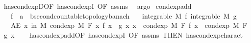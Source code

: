 \begin{isabellebody}
%
\isatagproof
{}\isamarkupfalse%
\ has{\isacharunderscore}{\kern0pt}cond{\isacharunderscore}{\kern0pt}expD{\isacharparenleft}{\kern0pt}{}{\isacharparenright}{\kern0pt}{\isacharbrackleft}{\kern0pt}OF\ has{\isacharunderscore}{\kern0pt}cond{\isacharunderscore}{\kern0pt}expI{\isacharcomma}{\kern0pt}\ OF\ assms{\isacharbrackright}{\kern0pt}\ \isamarkupfalse%
\ argo%
\endisatagproof
{\isafoldproof}%
%
\isadelimproof
\isanewline
%
\endisadelimproof
\isanewline
\isanewline
\isanewline
{}\isamarkupfalse%
\ cond{\isacharunderscore}{\kern0pt}exp{\isacharunderscore}{\kern0pt}add{\isacharcolon}{\kern0pt}\isanewline
\ \ \ f\ {\isacharcolon}{\kern0pt}{\isacharcolon}{\kern0pt}\ {\isachardoublequoteopen}{\isacharprime}{\kern0pt}a\ {\isasymRightarrow}\ {\isacharprime}{\kern0pt}b{\isacharcolon}{\kern0pt}{\isacharcolon}{\kern0pt}{\isacharbraceleft}{\kern0pt}second{\isacharunderscore}{\kern0pt}countable{\isacharunderscore}{\kern0pt}topology{\isacharcomma}{\kern0pt}banach{\isacharbraceright}{\kern0pt}{\isachardoublequoteclose}\isanewline
\ \ \ {\isachardoublequoteopen}integrable\ M\ f{\isachardoublequoteclose}\ {\isachardoublequoteopen}integrable\ M\ g{\isachardoublequoteclose}\isanewline
\ \ \ {\isachardoublequoteopen}AE\ x\ in\ M{\isachardot}{\kern0pt}\ cond{\isacharunderscore}{\kern0pt}exp\ M\ F\ {\isacharparenleft}{\kern0pt}{\isasymlambda}x{\isachardot}{\kern0pt}\ f\ x\ {\isacharplus}{\kern0pt}\ g\ x{\isacharparenright}{\kern0pt}\ x\ {\isacharequal}{\kern0pt}\ cond{\isacharunderscore}{\kern0pt}exp\ M\ F\ f\ x\ {\isacharplus}{\kern0pt}\ cond{\isacharunderscore}{\kern0pt}exp\ M\ F\ g\ x{\isachardoublequoteclose}\isanewline
%
\isadelimproof
\ \ %
\endisadelimproof
%
\isatagproof
{}\isamarkupfalse%
\ has{\isacharunderscore}{\kern0pt}cond{\isacharunderscore}{\kern0pt}exp{\isacharunderscore}{\kern0pt}add{\isacharbrackleft}{\kern0pt}OF\ has{\isacharunderscore}{\kern0pt}cond{\isacharunderscore}{\kern0pt}expI{\isacharparenleft}{\kern0pt}{}{\isacharcomma}{\kern0pt}{}{\isacharparenright}{\kern0pt}{\isacharcomma}{\kern0pt}\ OF\ assms{\isacharcomma}{\kern0pt}\ THEN\ has{\isacharunderscore}{\kern0pt}cond{\isacharunderscore}{\kern0pt}exp{\isacharunderscore}{\kern0pt}charact{\isacharparenleft}{\kern0pt}{}{\isacharparenright}{\kern0pt}{\isacharbrackright}{\kern0pt}\ \isacommand{{\isachardot}{\kern0pt}}\isamarkupfalse%
%
\endisatagproof
{\isafoldproof}%
%
\isadelimproof
\isanewline
%
\endisadelimproof
\isanewline
{}\isamarkupfalse%

\end{isabellebody}
